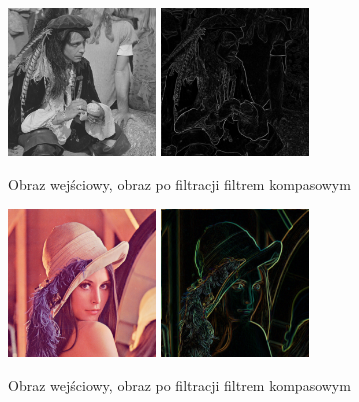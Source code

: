 \documentclass[final,a4paper,openany,12pt]{mwbk}
\begin{document}
\begin{figure}[H]
	\begin{center}
		\includegraphics[width=0.35\textwidth]{pirate_gray}
		\includegraphics[width=0.35\textwidth]{pirate_gray_compassSobol_result}
	\end{center}
	\caption{Obraz wejściowy, obraz po filtracji filtrem kompasowym}
\end{figure}

\begin{figure}[H]
	\begin{center}
		\includegraphics[width=0.35\textwidth]{lena_color}
		\includegraphics[width=0.35\textwidth]{lena_color_compassSobol_result}
	\end{center}
	\caption{Obraz wejściowy, obraz po filtracji filtrem kompasowym}
\end{figure}
\end{document}

